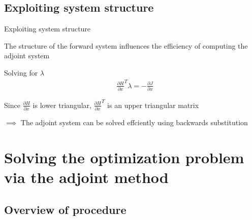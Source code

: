 \documentclass[xcolor=svgnames, english, smaller]{beamer}
\theoremstyle{plain}
\theoremstyle{definition}
\theoremstyle{plain}
\theoremstyle{plain}
\begin{document}
\subsection{Exploiting system structure}
\begin{frame}{Exploiting system structure}

The structure of the forward system influences the efficiency of computing the adjoint system
\newline
\begin{block}{Solving for $\lambda$}
\begin{equation}
\begin{aligned}
&\frac{\partial H}{\partial x}^T\lambda = -\frac{\partial J}{\partial x} \nonumber
\end{aligned}
\end{equation}
\end{block}

\pause Since $\frac{\partial H}{\partial x}$ is lower triangular, $\frac{\partial H}{\partial x}^T$ is an upper triangular matrix
\newline

$\implies$ The adjoint system can be solved effciently using backwards substitution

\end{frame}

\section{Solving the optimization problem via the adjoint method}


\subsection{Overview of procedure}

\end{document}
